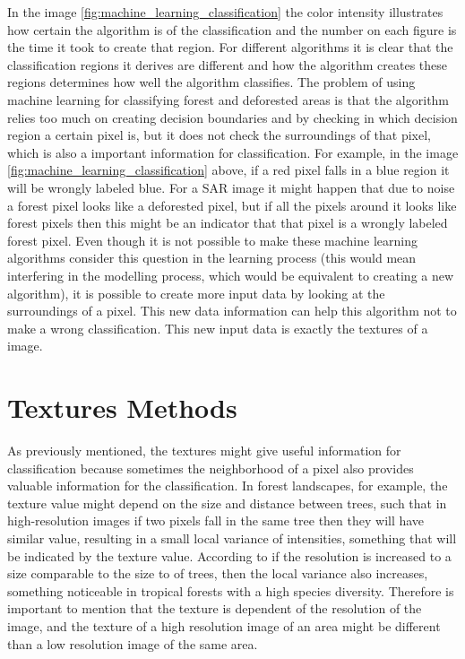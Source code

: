In the image \ref{fig:machine_learning_classification} the color intensity illustrates how certain the algorithm is of the classification and the number on each figure is the time it took to create that region.
\newline
For different algorithms it is clear that the classification regions it derives are different and how the algorithm creates these regions determines how well the algorithm classifies.
\newline
The problem of using machine learning for classifying forest and deforested areas is that the algorithm relies too much on creating decision boundaries and by checking in which decision region a certain pixel is, but it does not check the surroundings of that pixel, which is also a important information for classification. \newline
\newline
For example, in the image \ref{fig:machine_learning_classification} above, if a red pixel falls in a blue region it will be wrongly labeled blue. For a SAR image it might happen that due to noise a forest pixel looks like a deforested pixel, but if all the pixels around it looks like forest pixels then this might be an indicator that that pixel is a wrongly labeled forest pixel. Even though it is not possible to make these machine learning algorithms consider this question in the learning process (this would mean interfering  in the modelling process, which would be equivalent to creating a new algorithm), it is possible to create more input data by looking at the surroundings of a pixel. This new data information can help this algorithm not to make a wrong classification. This new input data is exactly the textures of a image.

\section{Textures Methods}
\label{sec:Texturization_Methods}
As previously mentioned, the textures might give useful information for classification because sometimes the neighborhood of a pixel also provides valuable information for the classification. In forest landscapes, for example, the texture value might depend on the size and distance between trees, such that in high-resolution images if two pixels fall in the same tree then they will have similar value, resulting in a small local variance of intensities, something that will be indicated by the texture value. According to \cite{Woodcock} if the resolution is increased to a size comparable to the size to of trees, then the local variance also increases, something noticeable in tropical forests with a high species diversity. Therefore is important to mention that the texture is dependent of the resolution of the image, and the texture of a high resolution image of an area might be different than a low resolution image of the same area.

